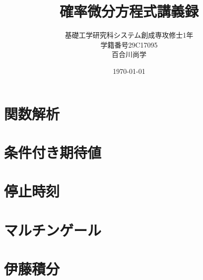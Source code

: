 \documentclass[11pt,a4paper]{jsreport}
\title{確率微分方程式講義録}
\author{基礎工学研究科システム創成専攻修士1年\\学籍番号29C17095\\百合川尚学}
\date{\today}
\theoremstyle{mystyle}
\begin{document}
%
%

\maketitle

\newpage
\tableofcontents
%
\chapter{関数解析}
	
	
\chapter{条件付き期待値}
	
	
	
\chapter{停止時刻}
	
\chapter{マルチンゲール}
	
	
	
	
	
\chapter{伊藤積分}
	
	
	
	
%
%
\end{document}
